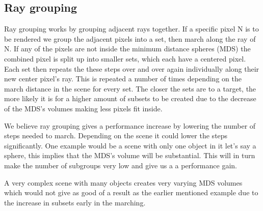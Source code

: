 			
		\subsection{Ray grouping}
		
			Ray grouping works by grouping adjacent rays together.  If a
			specific pixel N is to be rendered we group the adjacent pixels
			into a set, then march along the ray of N. If any of the pixels are
			not inside the minimum distance spheres (MDS) the combined pixel is
			split up into smaller sets, which each have a centered pixel. Each
			set then repeats the these steps over and over again individually
			along their new center pixel's ray.  This is repeated a number of
			times depending on the march distance in the scene for every set.
			The closer the sets are to a target, the more likely it is for a
			higher amount of subsets to be created due to the decrease of the
			MDS's volumes making less pixels fit inside.
			
			We believe ray grouping gives a performance increase by lowering
			the number of steps needed to march. Depending on the scene it
			could lower the steps significantly. One example would be a scene
			with only one object in it let's say a sphere, this implies that
			the MDS's volume will be substantial. This will in turn make the
			number of subgroups very low and give us a a performance gain. 
			
			A very complex scene with many objects creates very varying MDS
			volumes which would not give as good of a result as the earlier
			mentioned example due to the increase in subsets early in the
			marching.
